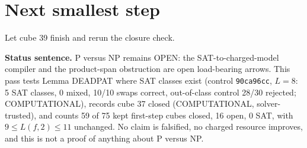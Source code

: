 \documentclass[11pt]{article}
\begin{document}
\section*{Next smallest step}
Let cube 39 finish and rerun the closure check.

\bigskip
\noindent\textbf{Status sentence.} P versus NP remains OPEN: the SAT-to-charged-model compiler and the product-span obstruction are open load-bearing arrows. This pass tests Lemma DEADPAT where SAT classes exist (control \texttt{90ca96cc}, $L=8$: 5 SAT classes, 0 mixed, 10/10 swaps correct, out-of-class control 28/30 rejected; COMPUTATIONAL), records cube 37 closed (COMPUTATIONAL, solver-trusted), and counts 59 of 75 kept first-step cubes closed, 16 open, 0 SAT, with $9\le L(f,2)\le 11$ unchanged. No claim is falsified, no charged resource improves, and this is not a proof of anything about P versus NP.
\end{document}
